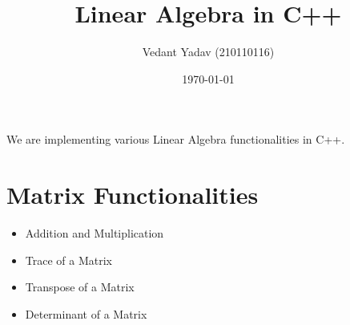 \documentclass[12pt, letterpaper]{article}
\title{Linear Algebra in C++}
\author{Vedant Yadav (210110116)}
\date{\today}
\begin{document}
\maketitle
We are implementing various Linear Algebra functionalities  in C++.
\section{Matrix Functionalities}
\begin{itemize}
	\item Addition and Multiplication
	\item Trace of a Matrix
	\item Transpose of a Matrix
	\item Determinant of a Matrix
\end{itemize}
	
\end{document}
